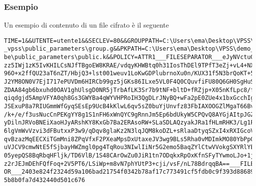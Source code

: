 \documentclass[a4paper,twoside,10pt,openany]{scrbook}
\newcommand{\TBibFile}{Cloud}
\begin{document}
\subsubsection{Esempio}
Un esempio di contenuto di un file cifrato è il seguente
\begin{verbatim}
TIME=1&&UTENTE=utente1&&SECLEV=80&&GROUPPATH=C:\Users\ema\Desktop\VPSS\demo
_vpss\public_parameters\group.g&&PKPATH=C:\Users\ema\Desktop\VPSS\demo_cpa
be\public_parameters\public.k&&POLICY=ATTR1___FILESEPARATOR___eJyNVctuGzEM/BVj
zz5IWj1zK5IvKHILCsNJfTBgoEW8KRAE/vdqyKHWBtq0h31IosThDEl9TPfT3eZj+vL4+NXL3273a3
96O+x2ffQU23aT6nZT/HbjQ3+lst001weuv1LoKwGDPlubrnoXu0n/KUX31f5N3brQoKT+5P50O+8z
J2YM8ON0V7EjI717ePUVDm6HIRCb99gz5jGKs86ILxe5VL0F4Q0CQuvfiFU80Q6GH0SgHuSFcwATQV
ZDAA84gb6bxuhd0OAV1ghUlsgD0NR5jTrbAfLK3Sr7b9tNF+bltD+fRZjp+X05nKfLpc8/fCYgfCcL
qiqdgjd5AmpVFYA0qh8Gs3GWYBa4qWYVHPRoIH3QgDLrJNyBQ+wFa2pE0ZUe4x1bxGcchIgbxz8wnJ
JSExuP8a7RIUGmmWfGyqSEsEp9UcB4kKlwL6qv5sZ0buYjUnvfz83FbIAXOOGZlMgaT66BvoUkQNMw
/k+/e/f3usNucCnPEKgYY8g1S1nFH6xWnQYC9gRnnJm5Ep6bdUkyW5CPQvQ8AYGjAItpJGZSQ64RRS
yDilnJRVoBNEiXaoHJyARshKY8KxGb7Ba2ERAsoRW+SLaSDLAQzyakJRa1fHLmRHK3/Lg1PXXTcK5l
6lgVmWvVzvi3dFButxxP3w9/qDqv8glaKz2N3lqJQM8koDZL+sRlaaDtyqSZxI4xRXIGcoVxxzwug1
qvBzazMqEECXiTGmMni8ZPqVfxF2PXeaMpsDxUtaxeJV3wg9BLs5Rha0vMDImkMO80YbPpGpSlzFhL
uVJCV9cmwNtE5fSjbayHWZmgl0pg4TqRou3NIwlIiNr5G2emo5BaqZYlCtwVVokgSXYRlYE00ZtmoF
05yepQS8BqRbqHFljk/TD6VlB/1S48CArOwZu0JiR1tn7ODqkxRpOxKfnSFyTYwmoLJo+1j0azccWJ
z2rJEJmDEhFQfFoq+2V5PT6/LSiWp+m8vN7phYUtP3+cji/vsF/nL78BdrqqBA==___FILESEPARAT
OR___2403e824f2324d59a106bad21754f0342b78af17c773491cf5fdb0c9f393d886894b5da25
5b8b0fa7d432440d501c676
\end{verbatim}

%
%

\end{document}
